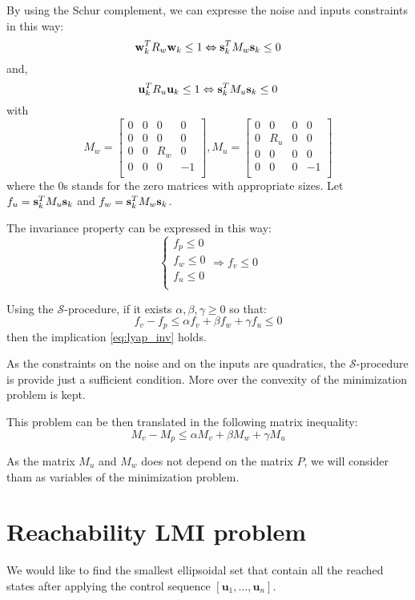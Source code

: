\documentclass{article}
\theoremstyle{named}
\newcommand{\vect}[1]{\ensuremath{ \mathbf{#1}}}
\newcommand{\Sproc}{$\mathcal{S}$-procedure}
\begin{document}
By using the Schur complement, we can expresse the noise and inputs constraints in this way:
$$
\wk^T R_w \wk \leq 1
\Leftrightarrow
\sk^T M_w \sk \leq 0
$$
and,
$$
\uk^T R_u \uk \leq 1
\Leftrightarrow
\sk^T M_u \sk \leq 0
$$
with
$$
M_w = \begin{bmatrix}
0&0&0&0\\
0&0&0&0\\
0&0&R_w&0\\
0&0&0&-1\\
\end{bmatrix},
M_u = \begin{bmatrix}
0&0&0&0\\
0&R_u&0&0\\
0&0&0&0\\
0&0&0&-1\\
\end{bmatrix}
$$
where the $0$s stands for the zero matrices with appropriate sizes.
Let $f_u = \sk^T M_u \sk$ and $f_w = \sk^T M_w \sk$.

The invariance property can be expressed in this way:
\begin{equation}\label{eq:lyap_inv}
\left\{
\begin{array}{l}
f_p \leq 0\\
f_w \leq 0\\
f_u \leq 0\\
\end{array}
\right.
\Rightarrow
f_v \leq 0
\end{equation}

Using the \Sproc{}, if it exists $\alpha,\beta,\gamma \geq 0$ so that:
$$
f_v-f_p \leq \alpha f_v + \beta f_w + \gamma f_u \leq 0
$$
then the implication \ref{eq:lyap_inv} holds.

As the constraints on the noise and on the inputs are quadratics, the \Sproc{} is provide just a sufficient condition. More over the convexity of the minimization problem is kept.

This problem can be then translated in the following matrix inequality:
$$
M_v-M_p \leq \alpha M_v + \beta M_w + \gamma M_u
$$

As the matrix $M_u$ and $M_w$ does not depend on the matrix $P$, we will consider tham as variables of the minimization problem.

\section{Reachability LMI problem}
\newcommand{\Vu}{V_{\vect{u}}}
\newcommand{\Vk}{V_{k}}
\newcommand{\Vkn}{V_{k+1}}
We would like to find the smallest ellipsoidal set that contain all the reached states after applying the control sequence $[\vect{u}_1,\dots,\vect{u}_n]$.
\end{document}
